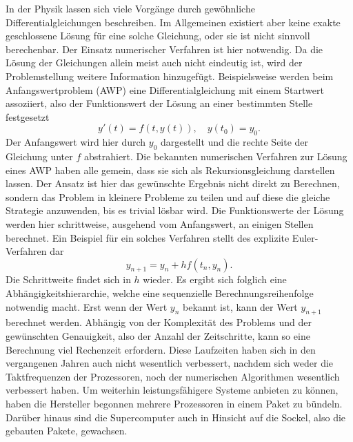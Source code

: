 In der Physik lassen sich viele Vorgänge durch gewöhnliche Differentialgleichungen beschreiben. Im Allgemeinen existiert aber keine exakte geschlossene Lösung für eine solche Gleichung, oder sie ist nicht sinnvoll berechenbar. Der Einsatz numerischer Verfahren ist hier notwendig. Da die Lösung der Gleichungen allein meist auch nicht eindeutig ist, wird der Problemstellung weitere Information hinzugefügt. Beispielsweise werden beim Anfangswertproblem (AWP) eine Differentialgleichung mit einem Startwert assoziiert, also der Funktionswert der Lösung an einer bestimmten Stelle festgesetzt
\begin{displaymath}
    y'(t) = f(t,y(t)), \quad y(t_0) = y_0.
\end{displaymath}
Der Anfangswert wird hier durch \(y_0\) dargestellt und die rechte Seite der Gleichung unter \(f\) abstrahiert. Die bekannten numerischen Verfahren zur Lösung eines AWP haben alle gemein, dass sie sich als Rekursionsgleichung darstellen lassen. Der Ansatz ist hier das gewünschte Ergebnis nicht direkt zu Berechnen, sondern das Problem in kleinere Probleme zu teilen und auf diese die gleiche Strategie anzuwenden, bis es trivial lösbar wird. Die Funktionswerte der Lösung werden hier schrittweise, ausgehend vom Anfangswert, an einigen Stellen berechnet. Ein Beispiel für ein solches Verfahren stellt des explizite Euler-Verfahren dar
\begin{displaymath}
    y_{n+1} = y_n + hf(t_n,y_n).
\end{displaymath}
Die Schrittweite findet sich in \(h\) wieder. Es ergibt sich folglich eine Abhängig\-keits\-hierarchie, welche eine sequenzielle Berechnungsreihenfolge notwendig macht. Erst wenn der Wert \(y_n\) bekannt ist, kann der Wert \(y_{n+1}\) berechnet werden. Abhängig von der Komplexität des Problems und der gewünschten Genauigkeit, also der Anzahl der Zeitschritte, kann so eine Berechnung viel Rechenzeit erfordern. Diese Laufzeiten haben sich in den vergangenen Jahren auch nicht wesentlich verbessert, nachdem sich weder die Taktfrequenzen der Prozessoren, noch der numerischen Algorithmen wesentlich verbessert haben. Um weiterhin leistungsfähigere Systeme anbieten zu können, haben die Hersteller begonnen mehrere Prozessoren in einem Paket zu bündeln. Darüber hinaus sind die Supercomputer auch in Hinsicht auf die Sockel, also die gebauten Pakete, gewachsen.\\


